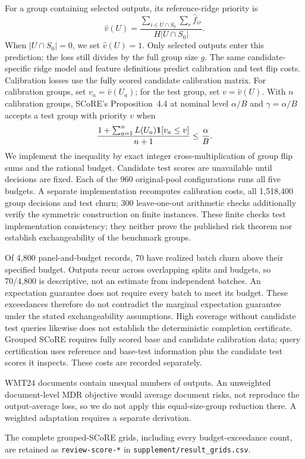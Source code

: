 For a group containing selected outputs, its reference-ridge priority is
\[
 \hat v(U)=\frac{\sum_{i\in U\cap S_0}\sum_r\hat f_{ir}}{H|U\cap S_0|}.
\]
When $|U\cap S_0|=0$, we set $\hat v(U)=1$. Only selected outputs enter this prediction; the loss still divides by the full group size $g$. The same candidate-specific ridge model and feature definitions predict calibration and test flip costs. Calibration losses use the fully scored candidate calibration matrix. For calibration groups, set $v_a=\hat v(U_a)$; for the test group, set $v=\hat v(U)$. With $n$ calibration groups, SCoRE's Proposition~4.4 at nominal level $\alpha/B$ and $\gamma=\alpha/B$ accepts a test group with priority $v$ when
\[
 \frac{1+\sum_{a=1}^{n}L(U_a)\mathbf{1}[v_a\le v]}{n+1}\le\frac{\alpha}{B}.
\]
We implement the inequality by exact integer cross-multiplication of group flip sums and the rational budget. Candidate test scores are unavailable until decisions are fixed. Each of the 960 original-pool configurations runs all five budgets. A separate implementation recomputes calibration costs, all 1,518,400 group decisions and test churn; 300 leave-one-out arithmetic checks additionally verify the symmetric construction on finite instances. These finite checks test implementation consistency; they neither prove the published risk theorem nor establish exchangeability of the benchmark groups.

Of 4,800 panel-and-budget records, 70 have realized batch churn above their specified budget. Outputs recur across overlapping splits and budgets, so 70/4,800 is descriptive, not an estimate from independent batches. An expectation guarantee does not require every batch to meet its budget. These exceedances therefore do not contradict the marginal expectation guarantee under the stated exchangeability assumptions. High coverage without candidate test queries likewise does not establish the deterministic completion certificate. Grouped SCoRE requires fully scored base and candidate calibration data; query certification uses reference and base-test information plus the candidate test scores it inspects. These costs are recorded separately.

WMT24 documents contain unequal numbers of outputs. An unweighted document-level MDR objective would average document risks, not reproduce the output-average loss, so we do not apply this equal-size-group reduction there. A weighted adaptation requires a separate derivation.

The complete grouped-SCoRE grids, including every budget-exceedance count, are retained as \texttt{review-score-*} in \nolinkurl{supplement/result_grids.csv}.

